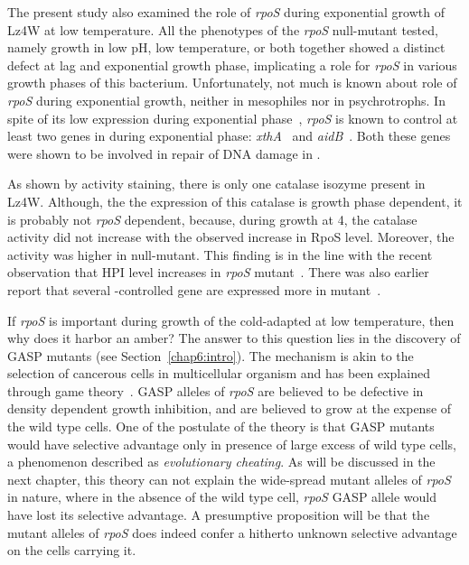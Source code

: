 The present study also examined the role of \emph{rpoS} during
exponential growth of Lz4W at low temperature. All the phenotypes
of the \emph{rpoS} null-mutant tested, namely growth in low pH,
low temperature, or both together showed a distinct defect at lag
and exponential growth phase, implicating a role for \emph{rpoS}
in various growth phases of this bacterium. Unfortunately, not
much is known about role of \emph{rpoS} during exponential growth,
neither in mesophiles nor in psychrotrophs. In spite of its low
expression during exponential phase~\citep{Lange1991}, \emph{rpoS}
is known to control at least two genes in  during
exponential phase: \emph{xthA}~\citep{Sak1989} and
\emph{aidB}~\citep{Loewen1994}. Both these genes were shown to be
involved in repair of DNA damage in .

As shown by activity staining, there is only one catalase isozyme
present in  Lz4W\@. Although, the the expression of
this catalase is growth phase dependent, it is probably not
\emph{rpoS} dependent, because, during growth at 4\dg{}, the
catalase activity did not increase with the observed increase in
RpoS level. Moreover, the activity was higher in 
null-mutant. This finding is in the line with the recent
observation that HPI level increases in  \emph{rpoS}
mutant~\citep{Visick1997}. There was also earlier report that
several \siga{}-controlled gene are expressed more in \sigs{}
mutant~\citep{Farewell1998}.

If \emph{rpoS} is important during growth of the cold-adapted
 at low temperature, then why does it harbor an
amber? The answer to this question lies in the discovery of GASP
mutants (see Section~\ref{chap6:intro}). The mechanism is akin to
the selection of cancerous cells in multicellular organism and has
been explained through game theory~\citep{Vulic2001}. GASP alleles
of \emph{rpoS} are believed to be defective in density dependent
growth inhibition, and are believed to grow at the expense of the
wild type cells. One of the postulate of the theory is that GASP
mutants would have selective advantage only in presence of large
excess of wild type cells, a phenomenon described as
\emph{evolutionary cheating}. As will be discussed in the next
chapter, this theory can not explain the wide-spread mutant
alleles of \emph{rpoS} in nature, where in the absence of the wild
type cell, \emph{rpoS} GASP allele would have lost its selective
advantage. A presumptive proposition will be that the mutant
alleles of \emph{rpoS} does indeed confer a hitherto unknown
selective advantage on the cells carrying it.

